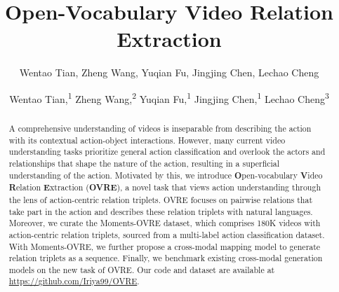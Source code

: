 \documentclass[letterpaper]{article}
\title{Open-Vocabulary Video Relation Extraction}
\author{
Wentao Tian, Zheng Wang, Yuqian Fu, Jingjing Chen, Lechao Cheng
}
\author {
    Wentao Tian,\textsuperscript{\rm 1} 
    Zheng Wang,\textsuperscript{\rm 2} \equalcontrib 
    Yuqian Fu,\textsuperscript{\rm 1} 
    Jingjing Chen,\textsuperscript{\rm 1}\equalcontrib 
    Lechao Cheng\textsuperscript{\rm 3}
}
\begin{document}
\maketitle
\begin{abstract}
A comprehensive understanding of videos is inseparable from describing the action with its contextual action-object interactions. However, many current video understanding tasks prioritize general action classification and overlook the actors and relationships that shape the nature of the action, resulting in a superficial understanding of the action. 
Motivated by this, we introduce \textbf{O}pen-vocabulary  \textbf{V}ideo \textbf{R}elation \textbf{E}xtraction (\textbf{OVRE}), a novel task that views action understanding through the lens of action-centric relation triplets. OVRE focuses on pairwise relations that take part in the action and describes these relation triplets with natural languages. Moreover, we curate the Moments-OVRE dataset, which comprises 180K videos with action-centric relation triplets, sourced from a multi-label action classification dataset. With Moments-OVRE, we further propose a cross-modal mapping model to generate relation triplets as a sequence. Finally, we benchmark existing cross-modal generation models on the new task of OVRE. Our code and dataset are available at 
\url{https://github.com/Iriya99/OVRE}.


\end{abstract}
\end{document}
